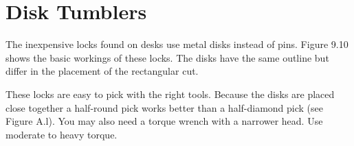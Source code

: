 \section{Disk Tumblers}
The inexpensive locks found on desks use metal disks instead of pins. Figure 9.10 shows the 
basic workings of these locks. The disks have the same outline but differ in the placement 
of the rectangular cut. 

These locks are easy to pick with the right tools. Because the disks are placed close 
together a half-round pick works better than a half-diamond pick (see Figure A.l). You may 
also need a torque wrench with a narrower head. Use moderate to heavy torque.
